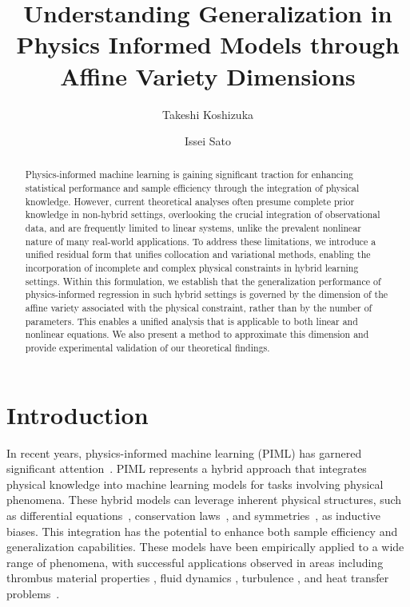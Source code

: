 \documentclass{article}
\title{Understanding Generalization in Physics Informed Models through Affine Variety Dimensions}
\author[1]{Takeshi Koshizuka}
\author[1]{Issei Sato}
\affil[1]{Department of Computer Science, The University of Tokyo}
\affil[1]{\{koshizuka-takeshi938444, sato\}@g.ecc.u-tokyo.ac.jp}
\theoremstyle{plain}
\theoremstyle{definition}
\theoremstyle{remark}
\begin{document}
\maketitle
\begin{abstract}
Physics-informed machine learning is gaining significant traction for enhancing statistical performance and sample efficiency through the integration of physical knowledge. However, current theoretical analyses often presume complete prior knowledge in non-hybrid settings, overlooking the crucial integration of observational data, and are frequently limited to linear systems, unlike the prevalent nonlinear nature of many real-world applications.
To address these limitations, we introduce a unified residual form that unifies collocation and variational methods, enabling the incorporation of incomplete and complex physical constraints in hybrid learning settings.
Within this formulation, we establish that the generalization performance of physics-informed regression in such hybrid settings is governed by the dimension of the affine variety associated with the physical constraint, rather than by the number of parameters. This enables a unified analysis that is applicable to both linear and nonlinear equations. We also present a method to approximate this dimension and provide experimental validation of our theoretical findings.
\end{abstract}
\section{Introduction}
In recent years, physics-informed machine learning (PIML) has garnered significant attention~\citep{rai2020driven,karniadakis2021physics,cuomo2022scientific,hao2022physics}. PIML represents a hybrid approach that integrates physical knowledge into machine learning models for tasks involving physical phenomena. These hybrid models can leverage inherent physical structures, such as differential equations~\citep{raissi2019physics}, conservation laws~\citep{jagtap2020conservative}, and symmetries~\citep{akhound2024lie}, as inductive biases. This integration has the potential to enhance both sample efficiency and generalization capabilities. These models have been empirically applied to a wide range of phenomena, with successful applications observed in areas including thrombus material properties \citep{yin2021non}, fluid dynamics \citep{cai2021flow,jin2021nsfnets}, turbulence \citep{wang2020towards}, and heat transfer problems~\citep{cai2021physics}.
\end{document}
